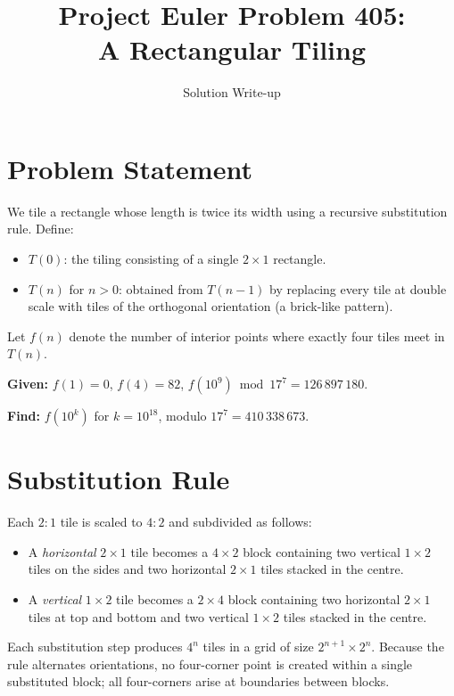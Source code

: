 \documentclass[11pt,a4paper]{article}
\title{Project Euler Problem 405:\\A Rectangular Tiling}
\author{Solution Write-up}
\date{}
\begin{document}
\maketitle

\section{Problem Statement}

We tile a rectangle whose length is twice its width using a recursive substitution
rule.  Define:
\begin{itemize}[nosep]
  \item $T(0)$: the tiling consisting of a single $2\times 1$ rectangle.
  \item $T(n)$ for $n>0$: obtained from $T(n-1)$ by replacing every tile at
        double scale with tiles of the orthogonal orientation (a brick-like pattern).
\end{itemize}

Let $f(n)$ denote the number of interior points where exactly four tiles meet
in~$T(n)$.

\medskip\noindent
\textbf{Given:} $f(1)=0$,\; $f(4)=82$,\; $f(10^9)\bmod 17^7 = 126\,897\,180$.

\medskip\noindent
\textbf{Find:} $f(10^k)$ for $k=10^{18}$, modulo $17^7 = 410\,338\,673$.

\section{Substitution Rule}

Each $2{:}1$ tile is scaled to $4{:}2$ and subdivided as follows:

\begin{itemize}[nosep]
  \item A \emph{horizontal} $2\times 1$ tile becomes a $4\times 2$ block
        containing two vertical $1\times 2$ tiles on the sides and two
        horizontal $2\times 1$ tiles stacked in the centre.
  \item A \emph{vertical} $1\times 2$ tile becomes a $2\times 4$ block
        containing two horizontal $2\times 1$ tiles at top and bottom and
        two vertical $1\times 2$ tiles stacked in the centre.
\end{itemize}

Each substitution step produces $4^n$ tiles in a grid of size
$2^{n+1}\times 2^n$.  Because the rule alternates orientations, no
four-corner point is created within a single substituted block; all
four-corners arise at boundaries between blocks.
\end{document}
